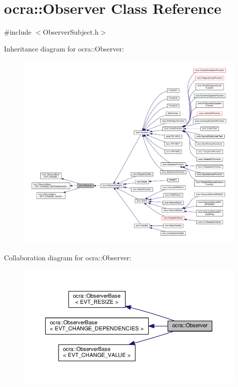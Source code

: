 \hypertarget{classocra_1_1Observer}{}\section{ocra\+:\+:Observer Class Reference}
\label{classocra_1_1Observer}


{\ttfamily \#include $<$Observer\+Subject.\+h$>$}



Inheritance diagram for ocra\+:\+:Observer\+:
\nopagebreak
\begin{figure}[H]
\begin{center}
\leavevmode
\includegraphics[width=350pt]{d8/dea/classocra_1_1Observer__inherit__graph}
\end{center}
\end{figure}


Collaboration diagram for ocra\+:\+:Observer\+:
\nopagebreak
\begin{figure}[H]
\begin{center}
\leavevmode
\includegraphics[width=350pt]{d2/d40/classocra_1_1Observer__coll__graph}
\end{center}
\end{figure}
